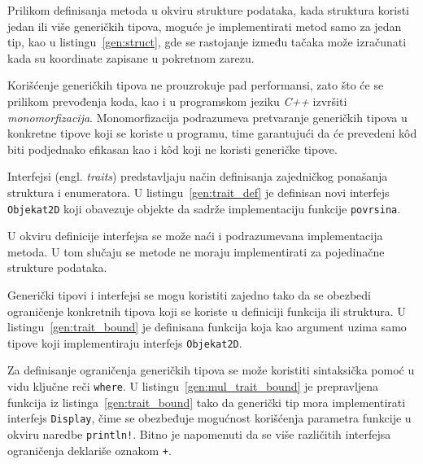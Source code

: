 \documentclass[12pt,oneside]{memoir}
\begin{document}
Prilikom definisanja metoda u okviru strukture podataka, kada struktura koristi
jedan ili više generičkih tipova, moguće je implementirati metod samo za jedan
tip, kao u listingu~\ref{gen:struct}, gde se rastojanje između tačaka može
izračunati kada su koordinate zapisane u pokretnom zarezu.



Korišćenje generičkih tipova ne prouzrokuje pad performansi, zato što će
se prilikom prevođenja koda, kao i u programskom jeziku \textit{C++}
izvršiti \textit{monomorfizacija}. Monomorfizacija
podrazumeva pretvaranje generičkih tipova u konkretne tipove koji se koriste u
programu, time garantujući da će prevedeni kôd biti podjednako efikasan kao
i kôd koji ne koristi generičke tipove.

Interfejsi (engl. \emph{traits}) predstavljaju način definisanja zajedničkog ponašanja
struktura i enumeratora. U listingu~\ref{gen:trait_def} je definisan novi
interfejs \texttt{Objekat2D} koji obavezuje objekte da sadrže implementaciju
funkcije \texttt{povrsina}.



U okviru definicije interfejsa se može naći i podrazumevana implementacija metoda.
U tom slučaju se metode ne moraju implementirati za pojedinačne strukture podataka.

Generički tipovi i interfejsi se mogu koristiti zajedno tako da se obezbedi ograničenje
konkretnih tipova koji se koriste u definiciji funkcija ili struktura. U
listingu~\ref{gen:trait_bound} je definisana funkcija koja kao argument uzima samo
tipove koji implementiraju interfejs \texttt{Objekat2D}.



Za definisanje ograničenja generičkih tipova se može koristiti sintaksička pomoć u
vidu ključne reči \texttt{where}. U listingu~\ref{gen:mul_trait_bound} je prepravljena
funkcija iz listinga~\ref{gen:trait_bound} tako da generički tip mora implementirati
interfejs \texttt{Display}, čime se obezbeđuje mogućnost korišćenja parametra funkcije
u okviru naredbe \texttt{println!}. Bitno je napomenuti da se više različitih interfejsa
ograničenja deklariše oznakom \texttt{+}.
\end{document}

